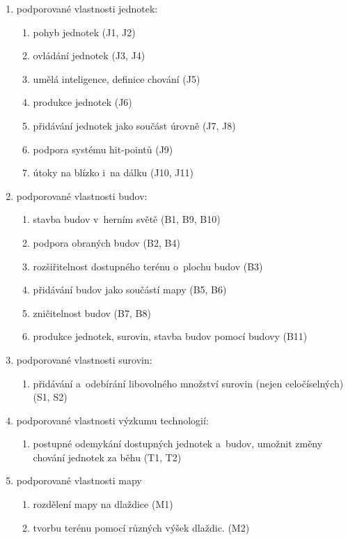 \begin{enumerate}
	\item podporované vlastnosti jednotek:
		\begin{enumerate}
			\item pohyb jednotek (J1, J2)
			\item ovládání jednotek (J3, J4)
			\item umělá inteligence, definice chování (J5)
			\item produkce jednotek (J6)
			\item přidávání jednotek jako součást úrovně (J7, J8)
			\item podpora systému hit-pointů (J9)
			\item útoky na blízko i~na dálku (J10, J11)
		\end{enumerate}
	\item podporované vlastnosti budov:
		\begin{enumerate}
			\item stavba budov v~herním světě (B1, B9, B10)
			\item podpora obraných budov (B2, B4)
			\item rozšiřitelnost dostupného terénu o~plochu budov (B3)
			\item přidávání budov jako součástí mapy (B5, B6)
			\item zničitelnost budov (B7, B8)
			\item produkce jednotek, surovin, stavba budov pomocí budovy (B11)
		\end{enumerate}
	\item podporované vlastnosti surovin:
		\begin{enumerate}
			\item přidávání a~odebírání libovolného množství surovin (nejen celočíselných) (S1, S2)
		\end{enumerate}
	\item podporované vlastnosti výzkumu technologií:
		\begin{enumerate}
			\item postupné odemykání dostupných jednotek a~budov, umožnit změny chování jednotek za běhu (T1, T2)
		\end{enumerate}
	\item podporované vlastnosti mapy
		\begin{enumerate}
			\item rozdělení mapy na dlaždice (M1)
			\item tvorbu terénu pomocí různých výšek dlaždic. (M2)

\end{enumerate}
\end{enumerate}
